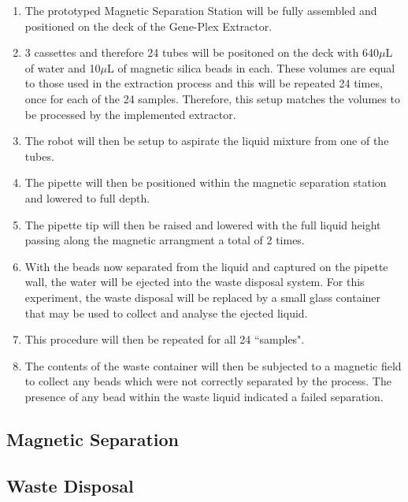 \begin{enumerate}
	\item The prototyped Magnetic Separation Station will be fully assembled and positioned on the deck of the Gene-Plex Extractor.
	\item 3 cassettes and therefore 24 tubes will be positoned on the deck with 640$\mu$L of water and 10$\mu$L of magnetic silica beads in each. These volumes are equal to those used in the extraction process and this will be repeated 24 times, once for each of the 24 samples. Therefore, this setup matches the volumes to be processed by the implemented extractor.
	\item The robot will then be setup to aspirate the liquid mixture from one of the tubes.
	\item The pipette will then be positioned within the magnetic separation station and lowered to full depth. 
	\item The pipette tip will then be raised and lowered with the full liquid height passing along the magnetic arrangment a total of 2 times.
	\item With the beads now separated from the liquid and captured on the pipette wall, the water will be ejected into the waste disposal system. For this experiment, the waste disposal will be replaced by a small glass container that may be used to collect and analyse the ejected liquid.
	\item This procedure will then be repeated for all 24 ``samples".
	\item The contents of the waste container will then be subjected to a magnetic field to collect any beads which were not correctly separated by the process. The presence of any bead within the waste liquid indicated a failed separation.
\end{enumerate}

\subsection{Magnetic Separation}

\subsection{Waste Disposal}